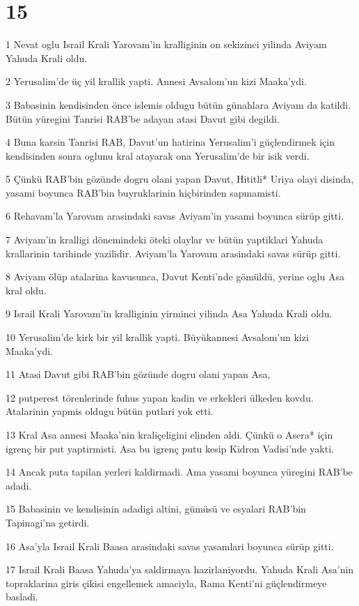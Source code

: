 \chapter{15}

\par 1 Nevat oglu Israil Krali Yarovam'in kralliginin on sekizinci yilinda Aviyam Yahuda Krali oldu.
\par 2 Yerusalim'de üç yil krallik yapti. Annesi Avsalom'un kizi Maaka'ydi.
\par 3 Babasinin kendisinden önce islemis oldugu bütün günahlara Aviyam da katildi. Bütün yüregini Tanrisi RAB'be adayan atasi Davut gibi degildi.
\par 4 Buna karsin Tanrisi RAB, Davut'un hatirina Yerusalim'i güçlendirmek için kendisinden sonra oglunu kral atayarak ona Yerusalim'de bir isik verdi.
\par 5 Çünkü RAB'bin gözünde dogru olani yapan Davut, Hititli* Uriya olayi disinda, yasami boyunca RAB'bin buyruklarinin hiçbirinden sapmamisti.
\par 6 Rehavam'la Yarovam arasindaki savas Aviyam'in yasami boyunca sürüp gitti.
\par 7 Aviyam'in kralligi dönemindeki öteki olaylar ve bütün yaptiklari Yahuda krallarinin tarihinde yazilidir. Aviyam'la Yarovam arasindaki savas sürüp gitti.
\par 8 Aviyam ölüp atalarina kavusunca, Davut Kenti'nde gömüldü, yerine oglu Asa kral oldu.
\par 9 Israil Krali Yarovam'in kralliginin yirminci yilinda Asa Yahuda Krali oldu.
\par 10 Yerusalim'de kirk bir yil krallik yapti. Büyükannesi Avsalom'un kizi Maaka'ydi.
\par 11 Atasi Davut gibi RAB'bin gözünde dogru olani yapan Asa,
\par 12 putperest törenlerinde fuhus yapan kadin ve erkekleri ülkeden kovdu. Atalarinin yapmis oldugu bütün putlari yok etti.
\par 13 Kral Asa annesi Maaka'nin kraliçeligini elinden aldi. Çünkü o Asera* için igrenç bir put yaptirmisti. Asa bu igrenç putu kesip Kidron Vadisi'nde yakti.
\par 14 Ancak puta tapilan yerleri kaldirmadi. Ama yasami boyunca yüregini RAB'be adadi.
\par 15 Babasinin ve kendisinin adadigi altini, gümüsü ve esyalari RAB'bin Tapinagi'na getirdi.
\par 16 Asa'yla Israil Krali Baasa arasindaki savas yasamlari boyunca sürüp gitti.
\par 17 Israil Krali Baasa Yahuda'ya saldirmaya hazirlaniyordu. Yahuda Krali Asa'nin topraklarina giris çikisi engellemek amaciyla, Rama Kenti'ni güçlendirmeye basladi.
